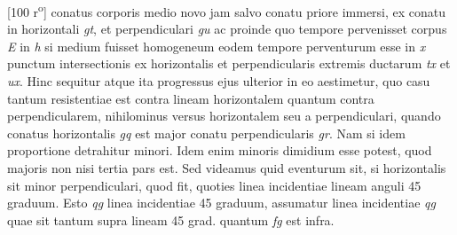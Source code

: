 [100 r\textsuperscript{o}] conatus\protect{} corporis  medio novo jam salvo conatu\protect{} priore immersi, ex conatu\protect{} in horizontali \textit{gt}, et perpendiculari \textit{gu} ac proinde quo tempore pervenisset corpus \textit{E} in \textit{h} si medium fuisset homogeneum eodem tempore  perventurum esse in \textit{x} punctum intersectionis  ex horizontalis et perpendicularis extremis ductarum \textit{tx} et \textit{ux}. Hinc sequitur  atque ita progressus ejus ulterior in eo aestimetur, quo casu tantum resistentiae est contra lineam horizontalem quantum contra perpendicularem, nihilominus   versus horizontalem seu a perpendiculari, quando conatus\protect{} horizontalis \textit{gq} est major conatu\protect{} perpendicularis \textit{gr}. Nam si idem  proportione detrahitur minori. Idem enim minoris dimidium esse potest, quod \pend\pstart\noindent majoris non nisi tertia pars est. Sed videamus quid eventurum sit, si horizontalis sit minor perpendiculari, quod fit, quoties linea incidentiae  lineam anguli 45 graduum. Esto \textit{qg} linea incidentiae 45 graduum, assumatur  linea incidentiae \textit{qg} quae sit tantum supra lineam 45 grad. quantum \textit{fg} est infra. \pend 
